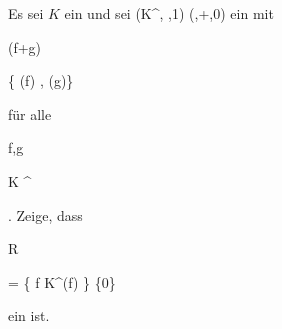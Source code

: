 {


Es sei $K$ ein
und sei
\maabbdisp {\nu} {(K^\times, \cdot,1)} { (\Z,+,0)
} {}
ein
mit


\mavergleichskette

{\vergleichskette

{ \nu(f+g)
}

{ \geq }{ \min\{ \nu(f) , \nu(g)\}
}

{  }{
}

{    }{
}

{   }{
}

}
{}{}{}
für alle


\mavergleichskette

{\vergleichskette

{ f,g
}

{ \in }{ K ^{\times}
}

{  }{
}

{    }{
}

{   }{
}

}
{}{}{.}
Zeige, dass


\mavergleichskettedisp

{\vergleichskette

{R
}

{ =} { \left\{ f \in K^\times   \mid  \nu(f)          \right\}   \cup \{0\}
}

{ } {
}

{ } {
}

{ } {
}

}
{}{}{}
ein
ist.


}

{} {}



{}

